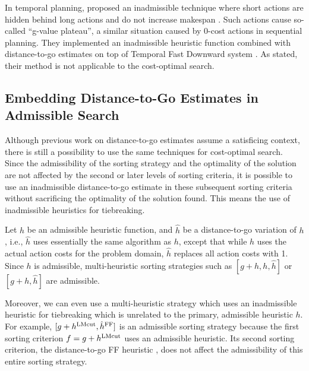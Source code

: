 In temporal planning,  proposed an inadmissible technique where short actions are
hidden behind long actions and do not increase makespan \cite{benton2010g}. Such actions cause so-called ``g-value
plateau'', a similar situation caused by 0-cost actions in sequential planning.  They implemented an inadmissible
heuristic function combined with distance-to-go estimates on top of Temporal Fast Downward system
\cite{eyerich2009using}.  As stated, their method is not applicable to the cost-optimal search.


\subsection{Embedding Distance-to-Go Estimates in Admissible Search}

Although previous work on distance-to-go estimates assume a satisficing context,
there is still a possibility to use the same techniques for cost-optimal search.
Since the admissibility of the sorting strategy and the optimality of the solution are not affected by the
second or later levels of sorting criteria, it is possible to use an inadmissible distance-to-go estimate
in these subsequent sorting criteria without sacrificing the optimality of the solution found.
This means the use of inadmissible heuristics for tiebreaking.

Let $h$ be an admissible heuristic function, and
$\hat{h}$ be a distance-to-go variation of $h$, i.e., $\hat{h}$ uses essentially the same algorithm as $h$, except that while $h$ uses the actual action costs for the problem domain, $\hat{h}$ replaces all action costs with 1.
Since $h$ is admissible, multi-heuristic sorting strategies such as $[g+h,h,\hat{h}]$ or $[g+h,\hat{h}]$
are admissible.

Moreover, we can even use a multi-heuristic strategy which uses an inadmissible heuristic for tiebreaking which is unrelated to the primary, admissible heuristic $h$.
 For example, $[g+h^{\text{LMcut}},\hat{h}^{\text{FF}}]$ is an admissible sorting strategy
because the first sorting criterion $f=g+h^{\text{LMcut}}$ uses an admissible
\lmcut heuristic. Its second sorting criterion, the distance-to-go FF
heuristic \cite{Hoffmann01}, does not affect the admissibility of this entire sorting strategy.

